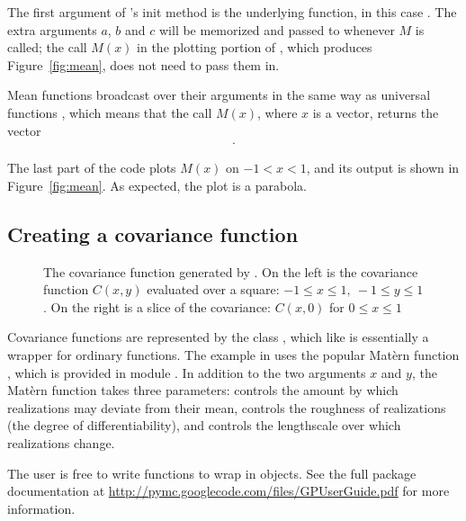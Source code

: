 \documentclass[article]{jss}
\begin{document}
The first argument of 's init method is the underlying  function, in this case . The extra arguments $a$, $b$  and $c$ will be memorized and passed to  whenever $M$ is called; the call $M(x)$ in the plotting portion of , which produces Figure~\ref{fig:mean}, does not need to pass them in.

Mean functions broadcast over their arguments in the same way as  universal functions \citep{numpybook}, which means that the call $M(x)$, where $x$ is a vector, returns the vector
\begin{eqnarray*}
    [M(x_0),\ldots, M(x_{N_x-1})].
\end{eqnarray*}

The last part of the code plots $M(x)$ on $-1<x<1$, and its output is shown in Figure~\ref{fig:mean}. As expected, the plot is a parabola.

\subsection{Creating a covariance function}\label{subsub:cov}
\begin{figure}
    \centering
    \caption{The covariance function generated by . On the left is the covariance function $C(x,y)$ evaluated over a square: $-1\le x\le 1,\ -1\le y\le 1$. On the right is a slice of the covariance: $C(x,0)$ for $0\le x \le 1$}
    \label{fig:cov}
\end{figure}

Covariance functions are represented by the class , which like  is essentially a wrapper for ordinary  functions. The example in  uses the popular Mat\`ern function \citep{banerjee}, which is provided in module . In addition to the two arguments $x$ and $y$, the Mat\`ern function takes three parameters:  controls the amount by which realizations may deviate from their mean,  controls the roughness of realizations (the degree of differentiability), and  controls the lengthscale over which realizations change.

The user is free to write functions to wrap in  objects. See the full package documentation at \href{http://pymc.googlecode.com/files/GPUserGuide.pdf}{http://pymc.googlecode.com/files/GPUserGuide.pdf} for more information.
\end{document}
